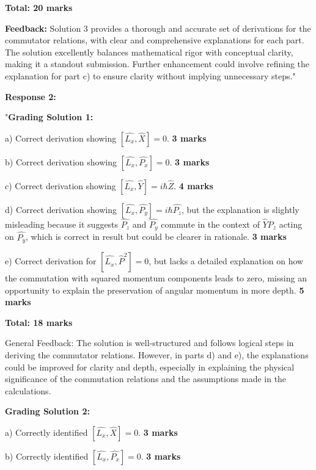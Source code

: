 \documentclass[a4paper,11pt]{article}
\begin{document}
\textbf{Total: 20 marks}

\textbf{Feedback:} Solution 3 provides a thorough and accurate set of derivations for the commutator relations, with clear and comprehensive explanations for each part. The solution excellently balances mathematical rigor with conceptual clarity, making it a standout submission. Further enhancement could involve refining the explanation for part c) to ensure clarity without implying unnecessary steps."

\textbf{Response 2:}

"\textbf{Grading Solution 1:}

a) Correct derivation showing \( \left[ \hat{L_{x}}, \hat{X} \right] = 0 \). \textbf{3 marks}

b) Correct derivation showing \( \left[ \hat{L_{x}}, \hat{P_{x}} \right] = 0 \). \textbf{3 marks}

c) Correct derivation showing \( \left[ \hat{L_{x}}, \hat{Y} \right] = i \hbar \hat{Z} \). \textbf{4 marks}

d) Correct derivation showing \( \left[ \hat{L_{x}}, \hat{P_{y}} \right] = i \hbar \hat{P_{z}} \), but the explanation is slightly misleading because it suggests \( \hat{P_{z}} \) and \( \hat{P_{y}} \) commute in the context of \( \hat{Y}\hat{P_{z}} \) acting on \( \hat{P_{y}} \), which is correct in result but could be clearer in rationale. \textbf{3 marks}

e) Correct derivation for \( \left[ \hat{L_{x}}, \hat{P}^{2} \right] = 0 \), but lacks a detailed explanation on how the commutation with squared momentum components leads to zero, missing an opportunity to explain the preservation of angular momentum in more depth. \textbf{5 marks}

\textbf{Total: 18 marks}

General Feedback: The solution is well-structured and follows logical steps in deriving the commutator relations. However, in parts d) and e), the explanations could be improved for clarity and depth, especially in explaining the physical significance of the commutation relations and the assumptions made in the calculations.

\hrulefill

\textbf{Grading Solution 2:}

a) Correctly identified \( \left[ \hat{L_{x}}, \hat{X} \right] = 0 \). \textbf{3 marks}

b) Correctly identified \( \left[ \hat{L_{x}}, \hat{P_{x}} \right] = 0 \). \textbf{3 marks}
\end{document}
